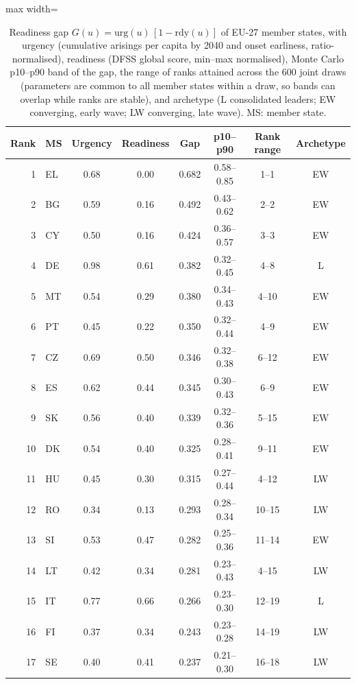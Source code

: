 \begin{table}[pos=t]\centering\footnotesize
\caption{Readiness gap $G(u)=\mathrm{urg}(u)\,[1-\mathrm{rdy}(u)]$ of EU-27 member states, with urgency (cumulative arisings per capita by 2040 and onset earliness, ratio-normalised), readiness (DFSS global score, min--max normalised), Monte Carlo p10--p90 band of the gap, the range of ranks attained across the 600 joint draws (parameters are common to all member states within a draw, so bands can overlap while ranks are stable), and archetype (L consolidated leaders; EW converging, early wave; LW converging, late wave). MS: member state.}
\label{tab:gap}
\begin{adjustbox}{max width=\linewidth}\begin{tabular}{@{}rlcccccc@{}}\toprule
Rank & MS & Urgency & Readiness & Gap & p10--p90 & Rank range & Archetype \\ \midrule
1 & EL & 0.68 & 0.00 & 0.682 & 0.58--0.85 & 1--1 & EW \\
2 & BG & 0.59 & 0.16 & 0.492 & 0.43--0.62 & 2--2 & EW \\
3 & CY & 0.50 & 0.16 & 0.424 & 0.36--0.57 & 3--3 & EW \\
4 & DE & 0.98 & 0.61 & 0.382 & 0.32--0.45 & 4--8 & L \\
5 & MT & 0.54 & 0.29 & 0.380 & 0.34--0.43 & 4--10 & EW \\
6 & PT & 0.45 & 0.22 & 0.350 & 0.32--0.44 & 4--9 & EW \\
7 & CZ & 0.69 & 0.50 & 0.346 & 0.32--0.38 & 6--12 & EW \\
8 & ES & 0.62 & 0.44 & 0.345 & 0.30--0.43 & 6--9 & EW \\
9 & SK & 0.56 & 0.40 & 0.339 & 0.32--0.36 & 5--15 & EW \\
10 & DK & 0.54 & 0.40 & 0.325 & 0.28--0.41 & 9--11 & EW \\
11 & HU & 0.45 & 0.30 & 0.315 & 0.27--0.44 & 4--12 & LW \\
12 & RO & 0.34 & 0.13 & 0.293 & 0.28--0.34 & 10--15 & LW \\
13 & SI & 0.53 & 0.47 & 0.282 & 0.25--0.36 & 11--14 & EW \\
14 & LT & 0.42 & 0.34 & 0.281 & 0.23--0.43 & 4--15 & LW \\
15 & IT & 0.77 & 0.66 & 0.266 & 0.23--0.30 & 12--19 & L \\
16 & FI & 0.37 & 0.34 & 0.243 & 0.23--0.28 & 14--19 & LW \\
17 & SE & 0.40 & 0.41 & 0.237 & 0.21--0.30 & 16--18 & LW \\

\end{tabular}
\end{adjustbox}
\end{table}
